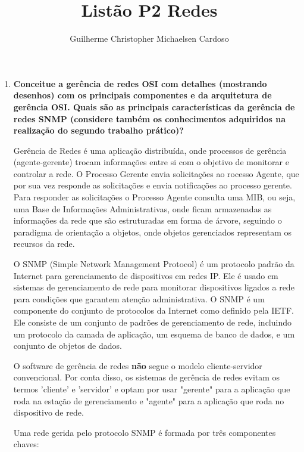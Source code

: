 \documentclass[10pt]{article}
\title{Listão P2 Redes}
\author{Guilherme Christopher Michaelsen Cardoso}
\begin{document}
\maketitle

\begin{enumerate}
    \item \textbf{Conceitue a gerência de redes OSI com detalhes (mostrando desenhos)
    com os principais componentes e da arquitetura de gerência OSI. Quais
    são as principais características da gerência de redes SNMP (considere
    também os conhecimentos adquiridos na realização do segundo trabalho
    prático)? }
        \par
        Gerência de Redes é uma aplicação distribuída, onde 
        processos de gerência (agente-gerente) trocam informações entre si
        com o objetivo de monitorar e controlar a rede. O 
        Processo Gerente envia solicitações ao 
        rocesso Agente, que por sua vez responde as solicitações
        e envia notificações ao processo gerente. Para responder as solicitações
        o Processo Agente consulta uma MIB, ou seja, uma Base de
        Informações Administrativas, onde ficam armazenadas as informações
        da rede que são estruturadas em forma de árvore, seguindo o 
       paradigma de orientação a objetos, onde objetos gerenciados
        representam os recursos da rede.

        O SNMP (Simple Network Management Protocol) é um protocolo padrão
        da Internet para gerenciamento de dispositivos em redes IP. Ele é
        usado em sistemas de gerenciamento de rede para monitorar dispositivos
        ligados a rede para condições que garantem atenção administrativa.
        O SNMP é um componente do conjunto de protocolos da Internet como
        definido pela IETF. Ele consiste de um conjunto de padrões de 
        gerenciamento de rede, incluindo um protocolo da camada de aplicação,
        um esquema de banco de dados, e um conjunto de objetos de dados.
        
        O software de gerência de redes \textbf{não} segue o modelo
        cliente-servidor convencional. Por conta disso, os sistemas de gerência
        de redes evitam os termos 'cliente' e 'servidor' e optam por usar
        "gerente" para a aplicação que roda na estação de gerenciamento
        e "agente" para a aplicação que roda no dispositivo de rede.

        Uma rede gerida pelo protocolo SNMP é formada por três componentes
        chaves:
        

\end{enumerate}
\end{document}
